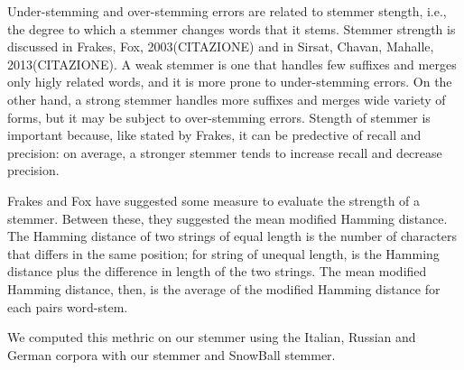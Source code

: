 \begin{itemize}
Under-stemming and over-stemming errors are related to stemmer stength, i.e., the degree to which a stemmer changes words that it stems. Stemmer strength is discussed in Frakes, Fox, 2003(CITAZIONE) and in Sirsat, Chavan, Mahalle, 2013(CITAZIONE).
A weak stemmer is one that handles few suffixes and merges only higly related words, and it is more prone to under-stemming errors.
On the other hand, a strong stemmer handles more suffixes and merges wide variety of forms, but it may be subject to over-stemming errors. Stength of stemmer is important because, like stated by Frakes, it can be predective of recall and precision: on average, a stronger stemmer tends to increase recall and decrease precision.

Frakes and Fox have suggested some measure to evaluate the strength of a stemmer. Between these, they suggested the mean modified Hamming distance. The Hamming distance of two strings of equal length is the number of characters that differs in the same position; for string of unequal length, is the Hamming distance plus the difference in length of the two strings. The mean modified Hamming distance, then, is the average of the modified Hamming distance for each pairs word-stem.

We computed this methric on our stemmer using the Italian, Russian and German corpora with our stemmer and SnowBall stemmer. 
\end{itemize}
